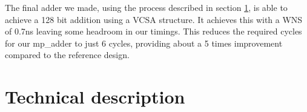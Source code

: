 \documentclass[a4paper,kul]{kulakarticle} %
\begin{document}
The final adder we made, using the process described in section \ref{sec:tech_desc}, is able to achieve a 128 bit addition using a VCSA structure. It achieves this with a WNS of 0.7ns leaving some headroom in our timings. This reduces the required cycles for our mp\_adder to just 6 cycles, providing about a 5 times improvement compared to the reference design. 


\newpage
\section{Technical description}
\label{sec:tech_desc}

\end{document}
